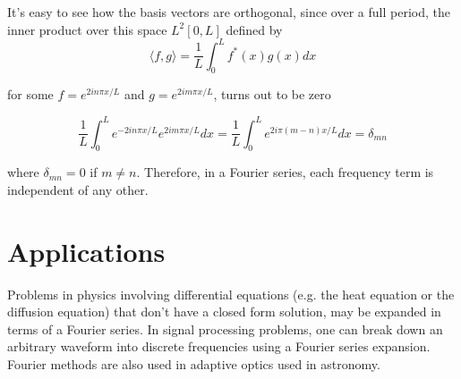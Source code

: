 \documentclass{article}
\begin{document}
	It's easy to see how the basis vectors are orthogonal, since over a full period, the inner product over this space $L^2[0,L]$ defined by $$ \langle f, g\rangle = \frac{1}{L} \int_0^L f^*(x) g(x) dx$$
	
	for some $f = e^{2in\pi x/L}$ and $g=e^{2im\pi x/L}$, turns out to be zero
	
	$$ \frac{1}{L}\int_{0}^{L} e^{-2in\pi x/L}e^{2im\pi x/L} dx = \frac{1}{L} \int_0^L e^{2i\pi(m-n)x/L} dx = \delta_{mn}$$
	
	where $\delta_{mn} = 0$ if $m \neq n$. Therefore, in a Fourier series, each frequency term is independent of any other.
	
	\section*{Applications}
	Problems in physics involving differential equations (e.g. the heat equation or the diffusion equation) that don't have a closed form solution, may be expanded in terms of a Fourier series. In signal processing problems, one can break down an arbitrary waveform into discrete frequencies using a Fourier series expansion.\\
	
	Fourier methods are also used in adaptive optics used in astronomy.
	
	
\end{document}

